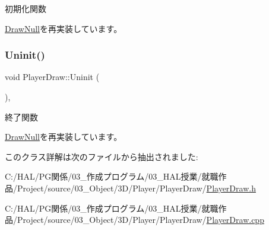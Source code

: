 初期化関数 



\mbox{\hyperlink{class_draw_null_acd7fef3ccea1da537ac9507ffbb6dd2e}{Draw\+Null}}を再実装しています。

\mbox{\label{class_player_draw_a917b2947914287f23d87ca75cd68f553}} 
\subsubsection{\texorpdfstring{Uninit()}{Uninit()}}
{\footnotesize\ttfamily void Player\+Draw\+::\+Uninit (\begin{DoxyParamCaption}{ }\end{DoxyParamCaption})\hspace{0.3cm}{\ttfamily [override]}, {\ttfamily [virtual]}}



終了関数 



\mbox{\hyperlink{class_draw_null_a12d44e341c7364b5ab9cdd661dc16187}{Draw\+Null}}を再実装しています。



このクラス詳解は次のファイルから抽出されました\+:\begin{DoxyCompactItemize}
\item 
C\+:/\+H\+A\+L/\+P\+G関係/03\+\_\+作成プログラム/03\+\_\+\+H\+A\+L授業/就職作品/\+Project/source/03\+\_\+\+Object/3\+D/\+Player/\+Player\+Draw/\mbox{\hyperlink{_player_draw_8h}{Player\+Draw.\+h}}\item 
C\+:/\+H\+A\+L/\+P\+G関係/03\+\_\+作成プログラム/03\+\_\+\+H\+A\+L授業/就職作品/\+Project/source/03\+\_\+\+Object/3\+D/\+Player/\+Player\+Draw/\mbox{\hyperlink{_player_draw_8cpp}{Player\+Draw.\+cpp}}\end{DoxyCompactItemize}
